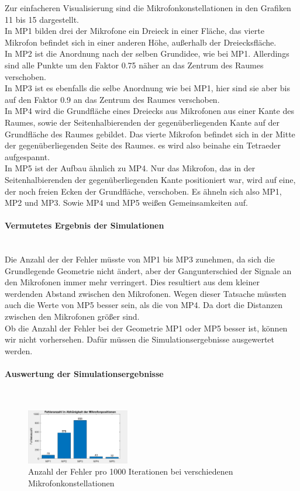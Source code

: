 Zur einfacheren Visualisierung sind die Mikrofonkonstellationen in den Grafiken 11 bis 15 dargestellt. \\
In MP1 bilden drei der Mikrofone ein Dreieck in einer Fläche, das vierte Mikrofon befindet sich in einer anderen Höhe, außerhalb der Dreiecksfläche.\\
In MP2 ist die Anordnung nach der selben Grundidee, wie bei MP1. Allerdings sind alle Punkte um den Faktor 0.75 näher an das Zentrum des Raumes verschoben.\\
In MP3 ist es ebenfalls die selbe Anordnung wie bei MP1, hier sind sie aber bis auf den Faktor 0.9 an das Zentrum des Raumes verschoben.\\
In MP4 wird die Grundfläche eines Dreiecks aus Mikrofonen aus einer Kante des Raumes, sowie der Seitenhalbierenden der gegenüberliegenden Kante auf der Grundfläche des Raumes gebildet. Das vierte Mikrofon befindet sich in der Mitte der gegenüberliegenden Seite des Raumes. es wird also beinahe ein Tetraeder aufgespannt. \\
In MP5 ist der Aufbau ähnlich zu MP4. Nur das Mikrofon, das in der Seitenhalbierenden der gegenüberliegenden Kante positioniert war, wird auf eine, der noch freien Ecken der Grundfläche, verschoben. Es ähneln sich also MP1, MP2 und MP3. Sowie MP4 und MP5 weißen Gemeinsamkeiten auf.

\paragraph{Vermutetes Ergebnis der Simulationen}\ \\
Die Anzahl der der Fehler müsste von MP1 bis MP3 zunehmen, da sich die Grundlegende Geometrie nicht ändert, aber der Gangunterschied der Signale an den Mikrofonen immer mehr verringert. Dies resultiert aus dem kleiner werdenden Abstand zwischen den Mikrofonen. Wegen dieser Tatsache müssten auch die Werte von MP5 besser sein, als die von MP4. Da dort die Distanzen zwischen den Mikrofonen größer sind.\\
Ob die Anzahl der  Fehler bei der Geometrie MP1 oder MP5 besser ist, können wir nicht vorhersehen. Dafür müssen die Simulationsergebnisse ausgewertet werden.
\paragraph{Auswertung der Simulationsergebnisse}\ \\
\begin{figure}
\centering 
\includegraphics[width=0.4\textwidth]{MikroPositionZusammenfassung}
\caption{Anzahl der Fehler pro 1000 Iterationen bei verschiedenen Mikrofonkonstellationen}\label{fig:Anzahl der Fehler pro 1000 Iterationen bei verschiedenen Mikrofonkonstellationen}
\end{figure}

